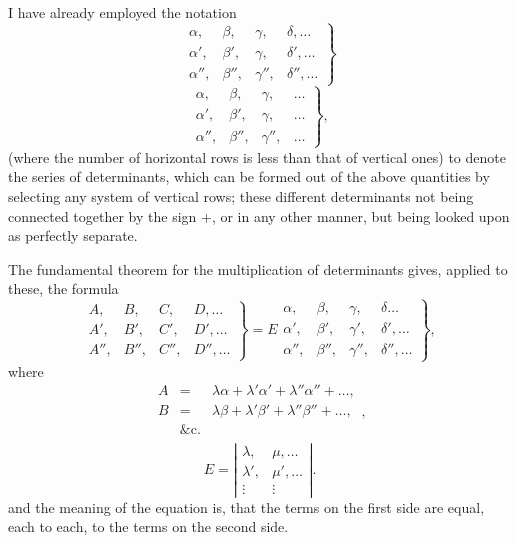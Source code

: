 \documentclass[11pt,a4paper]{article}
\theoremstyle{plain}
\theoremstyle{definition}
\theoremstyle{remark}
\begin{document}
I have already employed the notation
\[
\left.
\begin{array}{cccc}
\alpha, & \beta, & \gamma, & \delta, \ldots \\
\alpha', & \beta', & \gamma, & \delta', \ldots \\
\alpha'', & \beta'', & \gamma'', & \delta'', \ldots
\end{array}
\right\}
\tag{1}
\]
\[
\left.
\begin{array}{cccc}
\alpha, & \beta, & \gamma, & \ldots \\
\alpha', & \beta', & \gamma, & \ldots \\
\alpha'', & \beta'', & \gamma'', & \ldots
\end{array}
\right\}
\tag{2},
\]
(where the number of horizontal rows is less than that of vertical ones) to denote
the series of determinants, which can be formed out of the above quantities by selecting any system of vertical
rows; these different determinants not being connected together by the sign $+$, or in
any other manner, but being looked upon as perfectly separate.

The fundamental theorem for the multiplication of determinants gives, applied to
these, the formula
\[
\left.
\begin{array}{cccc}
A, & B, & C, & D, \ldots \\
A', & B', & C', & D', \ldots \\
A'', & B'', & C'', & D'', \ldots
\end{array}
\right\}
= E
\left.
\begin{array}{cccc}
\alpha, & \beta, & \gamma, & \delta \ldots \\
\alpha', & \beta', & \gamma', & \delta', \ldots \\
\alpha'', & \beta'', & \gamma'', & \delta'', \ldots
\end{array}
\right\}
\tag{3},
\]
where
\[
\begin{array}{rcl}
A &=& \lambda\alpha + \lambda'\alpha' + \lambda''\alpha'' + \ldots, \\
B &=& \lambda\beta + \lambda'\beta' + \lambda''\beta'' + \ldots, \\
&\&\text{c.} \\
\end{array}
\tag{4},
\]
\[
E = \left|\begin{array}{cc}
\lambda, & \mu, \ldots \\
\lambda', & \mu', \ldots \\
\vdots & \vdots
\end{array}\right|
\tag{5}.
\]
and the meaning of the equation is, that the terms on the first side are equal, each
to each, to the terms on the second side.
\end{document}
